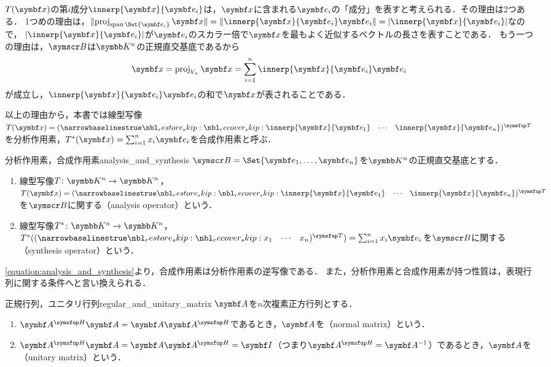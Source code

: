 \documentclass[../../main]{subfiles}
\begin{document}
\(T(\vect{x})\)の第\(i\)成分\(\innerp{\vect{x}}{\vect{e}_i}\)は，\(\vect{x}\)に含まれる\(\vect{e}_i\)の「成分」を表すと考えられる．その理由は2つある．
1つめの理由は，\(\vnorm{\proj_{\spannedby\Set{\vect{e}_i}}\vect{x}}=\vnorm{\innerp{\vect{x}}{\vect{e}_i}\vect{e}_i}=\abs{\innerp{\vect{x}}{\vect{e}_i}}\)なので，
\(\abs{\innerp{\vect{x}}{\vect{e}_i}}\)が\(\vect{e}_i\)のスカラー倍で\(\vect{x}\)を最もよく近似するベクトルの長さを表すことである．
もう一つの理由は，\(\basis{B}\)は\(\numset{K}^n\)の正規直交基底であるから
\begin{equation}
  \label{equation:analysis_and_synthesis}
  \vect{x} = \proj_{V_n}\vect{x}
  = \sum_{i=1}^n\innerp{\vect{x}}{\vect{e}_i}\vect{e}_i
\end{equation}
が成立し，\(\innerp{\vect{x}}{\vect{e}_i}\vect{e}_i\)の和で\(\vect{x}\)が表されることである．

以上の理由から，本書では線型写像\(T(\vect{x})=\trps{\rowvect{\innerp{\vect{x}}{\vect{e}_1} & \cdots & \innerp{\vect{x}}{\vect{e}_n}}}\)を分析作用素，\(\synth{T}(\vect{x})=\sum_{i=1}^nx_i\vect{e}_i\)を合成作用素と呼ぶ．

\begin{definition}{分析作用素，合成作用素}{analysis_and_synthesis}
  \(\basis{B}=\Set{\vect{e}_1,\dots,\vect{e}_n}\)を\(\numset{K}^n\)の正規直交基底とする．
  \begin{enumerate}
    \item 線型写像\(T\colon\numset{K}^n\to\numset{K}^n\)，\(T(\vect{x})=\trps{\rowvect{\innerp{\vect{x}}{\vect{e}_1} & \cdots & \innerp{\vect{x}}{\vect{e}_n}}}\)を\(\basis{B}\)に関する（analysis operator）という．
    \item 線型写像\(\synth{T}\colon\numset{K}^n\to\numset{K}^n\)，\(\synth{T}(\trps{\rowvect{x_1 & \cdots & x_n}})=\sum_{i=1}^nx_i\vect{e}_i\)を\(\basis{B}\)に関する（synthesis operator）という．
  \end{enumerate}
\end{definition}

\cref{equation:analysis_and_synthesis}より，合成作用素は分析作用素の逆写像である．
また，分析作用素と合成作用素が持つ性質は，表現行列に関する条件へと言い換えられる．

\begin{definition}{正規行列，ユニタリ行列}{regular_and_unitary_matrix}
  \(\mat{A}\)を\(n\)次複素正方行列とする．
  \begin{enumerate}
    \item \(\htrps{\mat{A}}\mat{A}=\mat{A}\htrps{\mat{A}}\)であるとき，\(\mat{A}\)を（normal matrix）という．
    \item \(\htrps{\mat{A}}\mat{A}=\mat{A}\htrps{\mat{A}}=\imat\)（つまり\(\htrps{\mat{A}}=\mat{A}^{-1}\)）であるとき，\(\mat{A}\)を（unitary matrix）という．
  \end{enumerate}
\end{definition}
\end{document}
